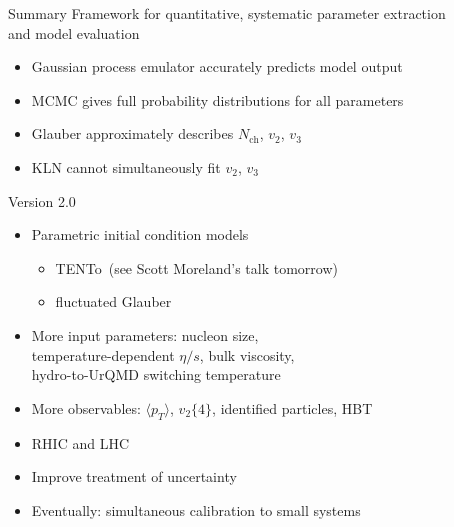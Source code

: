 \documentclass{beamer}
\newcommand{\avg}[1]{\langle #1 \rangle}
\newcommand{\nch}{N_\text{ch}}
\newcommand{\vnk}[2]{v_#1\{#2\}}
\newcommand{\trento}{T\raisebox{-.5ex}{R}ENTo}
\begin{document}
\begin{frame}{Summary}
  Framework for quantitative, systematic parameter extraction \\ and model evaluation
  \medskip
  \begin{itemize}
    \itemsep 2ex
    \item Gaussian process emulator accurately predicts model output
    \item MCMC gives full probability distributions for all parameters
    \item Glauber approximately describes $\nch$, $v_2$, $v_3$
    \item KLN cannot simultaneously fit $v_2$, $v_3$
  \end{itemize}
\end{frame}


\begin{frame}{Version 2.0}
  \begin{itemize}
    \itemsep 1ex
    \item Parametric initial condition models
      \begin{itemize}
        \item \trento\ (see Scott Moreland's talk tomorrow)
        \item fluctuated Glauber
      \end{itemize}
    \item More input parameters: nucleon size, \\ temperature-dependent $\eta/s$, bulk viscosity, \\ hydro-to-UrQMD switching temperature
    \item More observables: $\avg{p_T}$, $\vnk 2 4$, identified particles, HBT
    \item RHIC and LHC
    \item Improve treatment of uncertainty
      \medskip
    \item Eventually: simultaneous calibration to small systems
  \end{itemize}
\end{frame}


\appendix
\end{document}
